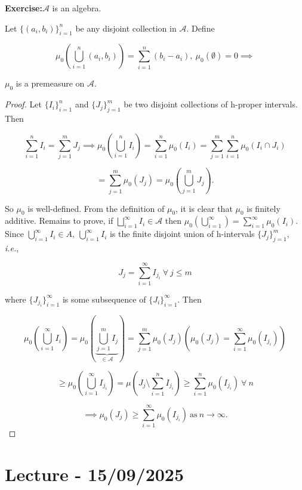 \documentclass{functionspaces}
\begin{document}
\noindent\textbf{Exercise:}$\mathcal{A}$ is an algebra.

\begin{proposition}
Let $\{(a_{i},b_{i})\}_{i=1}^{n}$ be any disjoint collection in $\mathcal{A}.$ Define

\[
\mu_{0}\left(\bigcup_{i=1}^{n} (a_{i},b_{i})\right) = \sum_{i=1}^{n} (b_{i} - a_{i}),\ \mu_{0}(\emptyset) = 0 \implies
\]

$\mu_{0}$ is a premeasure on $\mathcal{A}.$
\end{proposition}

\begin{proof}
Let $\{I_{i}\}_{i=1}^{n}$ and $\{J_{j}\}_{j=1}^{m}$ be two disjoint collections of h-proper intervals. Then

\[
\sum_{i=1}^{n} I_{i} = \sum_{j=1}^{m} J_{j} \implies \mu_{0}\left(\bigcup_{i=1}^{n} I_{i}\right) = \sum_{i=1}^{n} \mu_{0}(I_{i}) = \sum_{j=1}^{m} \sum_{i=1}^{n} \mu_{0}(I_{i} \cap J_{i})
\]

\[
= \sum_{j=1}^{m} \mu_{0}(J_{j}) = \mu_{0}\left(\bigcup_{j=1}^{m} J_{j}\right).
\]

So $\mu_{0}$ is well-defined. From the definition of $\mu_{0}$, it is clear that $\mu_{0}$ is finitely additive. Remains to prove, if $\bigsqcup_{i=1}^{\infty} I_{i} \in \mathcal{A}$ then $\mu_{0}(\bigcup_{i=1}^{\infty}) = \sum_{i=1}^{\infty} \mu_{0}(I_{i}).$ Since $\bigcup_{i=1}^{\infty} I_{i} \in A,\ \bigcup_{i=1}^{\infty} I_{i}$ is the finite disjoint union of h-intervals $\{J_{j}\}_{j=1}^{m}$, \textit{i.e.},

\[
J_{j} = \sum_{i=1}^{\infty} I_{j_{i}}\ \forall\ j \leq m
\]

where $\{J_{j_{i}}\}_{i=1}^{\infty}$ is some subsequence of $\{J_{i}\}_{i=1}^{\infty}$. Then

\[
\mu_{0}\left(\bigcup_{i=1}^{\infty} I_{i}\right) = \mu_{0}\left(\underbrace{\bigcup_{j=1}^{m} I_{j}}_{\in \mathcal{A}}\right) = \sum_{j=1}^{m} \mu_{0}(J_{j}) \left(\mu_{0}(J_{j}) = \sum_{i=1}^{\infty} \mu_{0}(I_{j_{i}})\right)
\]

\[
\geq \mu_{0}\left(\bigcup_{i=1}^{\infty} I_{j_{i}}\right) = \mu\left(J_{j} \setminus \sum_{i=1}^{n} I_{j_{i}}\right) \geq \sum_{i=1}^{n} \mu_{0}(I_{j_{i}})\ \forall\ n
\]

\[
\implies \mu_{0}(J_{j}) \geq \sum_{i=1}^{\infty} \mu_{0}(I_{j_{i}})\ \text{as}\ n \to \infty.
\]
\end{proof}

\endgroup


\newpage
\section{Lecture - 15/09/2025}
\end{document}
